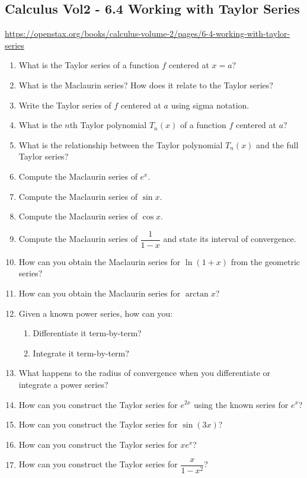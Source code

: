 \subsection{Calculus Vol2 - 6.4 Working with Taylor Series}

\url{https://openstax.org/books/calculus-volume-2/pages/6-4-working-with-taylor-series}

\begin{enumerate}
  \item What is the Taylor series of a function $f$ centered at $x=a$?
  \item What is the Maclaurin series? How does it relate to the Taylor series?
  \item Write the Taylor series of $f$ centered at $a$ using sigma notation.
  \item What is the $n$th Taylor polynomial $T_n(x)$ of a function $f$ centered at $a$?
  \item What is the relationship between the Taylor polynomial $T_n(x)$ and the full Taylor series?
  \item Compute the Maclaurin series of $e^x$.
  \item Compute the Maclaurin series of $\sin x$.
  \item Compute the Maclaurin series of $\cos x$.
  \item Compute the Maclaurin series of $\dfrac{1}{1-x}$ and state its interval of convergence.
  \item How can you obtain the Maclaurin series for $\ln(1+x)$ from the geometric series?
  \item How can you obtain the Maclaurin series for $\arctan x$?
  \item Given a known power series, how can you:
    \begin{enumerate}
      \item Differentiate it term-by-term?
      \item Integrate it term-by-term?
    \end{enumerate}
  \item What happens to the radius of convergence when you differentiate or integrate a power series?
  \item How can you construct the Taylor series for $e^{2x}$ using the known series for $e^x$?
  \item How can you construct the Taylor series for $\sin(3x)$?
  \item How can you construct the Taylor series for $x e^x$?
  \item How can you construct the Taylor series for $\dfrac{x}{1-x^2}$?

\end{enumerate}
